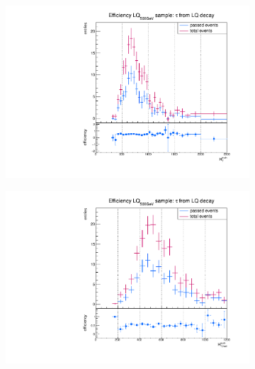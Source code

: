 \begin{figure}
  \centering
                \begin{subfigure}[t]{0.49\textwidth}
                \includegraphics[width=\textwidth]{figures/plots/LQ75/Divided_fromLQHT.pdf}
                \label{DividedFromLQ:signal:HTLQ75}
                \end{subfigure}
                \begin{subfigure}[t]{0.49\textwidth}
                \includegraphics[width=\textwidth]{figures/plots/LQ75/Divided_fromLQHThad.pdf}

\end{subfigure}
\end{figure}
